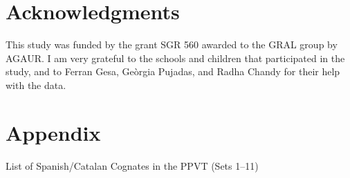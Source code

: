 \documentclass[output=paper,modfonts,nonflat,newtxmath]{langsci/langscibook}
\begin{document}
\section*{Acknowledgments}

{This study was funded by the grant SGR 560 awarded to the GRAL group by AGAUR. I am very grateful to the schools and children that participated in the study, and to Ferran Gesa, Geòrgia Pujadas, and Radha Chandy for their help with the data.}


\section*{Appendix}


List of Spanish/Catalan Cognates in the PPVT (Sets 1--11)\\
\end{document}
